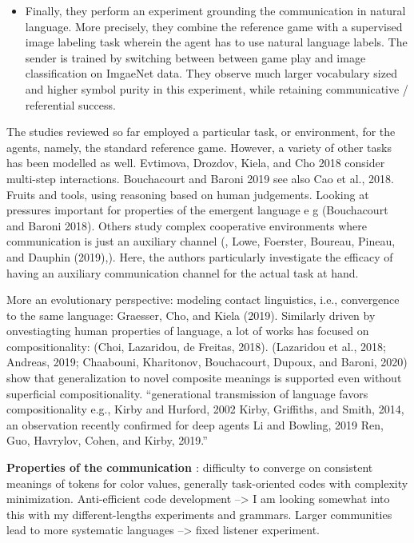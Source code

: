 \begin{itemize}
	\item Finally, they perform an experiment grounding the communication in natural language. More precisely, they combine the reference game with a supervised image labeling task wherein the agent has to use natural language labels. The sender is trained by switching between between game play and image classification on ImgaeNet data. They observe much larger vocabulary sized and higher symbol purity in this experiment, while retaining communicative / referential success. 	
\end{itemize}

The studies reviewed so far employed a particular  task, or environment, for the agents, namely, the standard reference game. However, a variety of other tasks has been modelled as well.
Evtimova, Drozdov, Kiela, and Cho 2018 consider multi-step interactions. Bouchacourt and Baroni 2019 see also Cao et al., 2018. Fruits and tools, using reasoning based on human judgements.
Looking at pressures important for properties of the emergent language e g  (Bouchacourt and Baroni 2018). 
Others study complex cooperative environments where communication is just an auxiliary channel (\parencite{das2019tarmac}, Lowe, Foerster, Boureau, Pineau, and Dauphin (2019),). Here, the authors particularly investigate the efficacy of having an auxiliary communication channel for the actual task at hand.

More an evolutionary perspective: modeling contact linguistics, i.e., convergence to the same language: Graesser, Cho, and Kiela (2019). Similarly driven by onvestiagting human properties of language, a lot of works has focused on compositionality: (Choi, Lazaridou, de Freitas, 2018). (Lazaridou et al., 2018; Andreas, 2019; Chaabouni, Kharitonov, Bouchacourt, Dupoux, and Baroni, 2020) show that generalization to novel composite meanings is supported even without superficial compositionality. 
``generational transmission of language favors compositionality e.g., Kirby and Hurford, 2002 Kirby, Griffiths, and Smith, 2014, an observation recently confirmed for deep agents Li and Bowling, 2019 Ren, Guo, Havrylov, Cohen, and Kirby, 2019.''

\textbf{Properties of the communication \parencite{lazaridou2020multi}}: difficulty to converge on consistent meanings of tokens for color values, generally task-oriented codes with complexity minimization. Anti-efficient code development --> I am looking somewhat into this with my different-lengths experiments and grammars.  Larger communities lead to more systematic languages --> fixed listener experiment.

